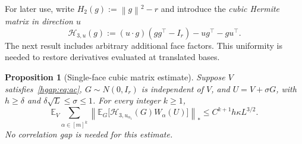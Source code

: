\documentclass[11pt,letterpaper,twoside,leqno]{article}
\theoremstyle{bookplain}
\newtheorem{proposition}{Proposition}
\theoremstyle{bookremark}
\newcommand{\E}{\mathbb E}
\newcommand{\norm}[1]{\left\lVert#1\right\rVert}
\begin{document}
For later use, write $H_2(g):=\norm g^2-r$ and introduce the
\emph{cubic Hermite matrix in direction $u$}
\begin{equation}
 \mathcal H_{3,u}(g):=(u\cdot g)(gg^\top-I_r)-ug^\top-gu^\top.
 \label{hgap:eq:H3}
\end{equation}
The next result includes arbitrary additional face factors. This
uniformity is needed to restore derivatives evaluated at translated bases.

\begin{proposition}[Single-face cubic matrix estimate]\label{hgap:prop:cubic}
Suppose $V$ satisfies~\eqref{hgap:eq:ac}, $G\sim N(0,I_r)$ is
independent of $V$, and $U=V+\sigma G$, with
$h\ge\delta$ and $\delta\sqrt L\le\sigma\le1$.
For every integer $k\ge1$,
\begin{equation}
 \E_V\sum_{\alpha\in[m]^k}
 \left\|\E_G\bigl[\mathcal H_{3,u_{\alpha_1}}(G)
                    W_\alpha(U)\bigr]\right\|_*
 \le C^{k+1}h\kappa L^{3/2}.
 \label{hgap:eq:cubic-matrix}
\end{equation}
No correlation gap is needed for this estimate.
\end{proposition}
\end{document}
